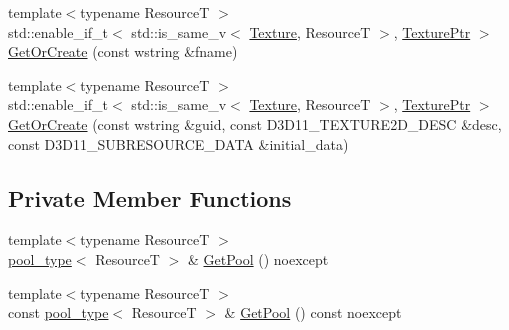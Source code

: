 \begin{DoxyCompactItemize}
\item 
{\footnotesize template$<$typename ResourceT $>$ }\\std\+::enable\+\_\+if\+\_\+t$<$ std\+::is\+\_\+same\+\_\+v$<$ \mbox{\hyperlink{classmage_1_1rendering_1_1_texture}{Texture}}, ResourceT $>$, \mbox{\hyperlink{namespacemage_1_1rendering_a6f3ae54f825328465b0cdde0f0de4a36}{Texture\+Ptr}} $>$ \mbox{\hyperlink{classmage_1_1rendering_1_1_resource_manager_a5a1db7a1b2aae7e2ea5759820c875d78}{Get\+Or\+Create}} (const wstring \&fname)
\item 
{\footnotesize template$<$typename ResourceT $>$ }\\std\+::enable\+\_\+if\+\_\+t$<$ std\+::is\+\_\+same\+\_\+v$<$ \mbox{\hyperlink{classmage_1_1rendering_1_1_texture}{Texture}}, ResourceT $>$, \mbox{\hyperlink{namespacemage_1_1rendering_a6f3ae54f825328465b0cdde0f0de4a36}{Texture\+Ptr}} $>$ \mbox{\hyperlink{classmage_1_1rendering_1_1_resource_manager_a330efb725a94fec87a996e0048589d1b}{Get\+Or\+Create}} (const wstring \&guid, const D3\+D11\+\_\+\+T\+E\+X\+T\+U\+R\+E2\+D\+\_\+\+D\+E\+SC \&desc, const D3\+D11\+\_\+\+S\+U\+B\+R\+E\+S\+O\+U\+R\+C\+E\+\_\+\+D\+A\+TA \&initial\+\_\+data)
\end{DoxyCompactItemize}
\subsection*{Private Member Functions}
\begin{DoxyCompactItemize}
\item 
{\footnotesize template$<$typename ResourceT $>$ }\\\mbox{\hyperlink{classmage_1_1rendering_1_1_resource_manager_ab21a4e280087032ee533f267bd9bf602}{pool\+\_\+type}}$<$ ResourceT $>$ \& \mbox{\hyperlink{classmage_1_1rendering_1_1_resource_manager_a91891df90f569c3f3f72a51c8a2f6ae5}{Get\+Pool}} () noexcept
\item 
{\footnotesize template$<$typename ResourceT $>$ }\\const \mbox{\hyperlink{classmage_1_1rendering_1_1_resource_manager_ab21a4e280087032ee533f267bd9bf602}{pool\+\_\+type}}$<$ ResourceT $>$ \& \mbox{\hyperlink{classmage_1_1rendering_1_1_resource_manager_a5cba7eab859779a7cb74d5f2cef21173}{Get\+Pool}} () const noexcept
\end{DoxyCompactItemize}
